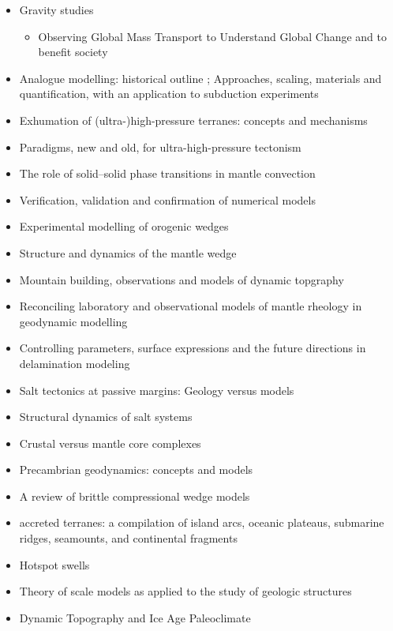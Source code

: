 \begin{itemize}
\item Gravity studies
   \begin{itemize}
   \item Observing Global Mass Transport to Understand Global Change and to benefit society \cite{pabb15}
   \end{itemize}


\item Analogue modelling: historical outline \cite{koyi97}; Approaches, scaling, materials and quantification, with an application to subduction experiments \cite{scst16}
\item Exhumation of (ultra-)high-pressure terranes: concepts and mechanisms \cite{warr13}
\item Paradigms, new and old, for ultra-high-pressure tectonism \cite{hage13}
\item The role of solid–solid phase transitions in mantle convection \cite{fada17}
\item Verification, validation and confirmation of numerical models \cite{orsb94}
\item Experimental modelling of orogenic wedges \cite{grmd12}
\item Structure and dynamics of the mantle wedge \cite{vank03}
\item Mountain building, observations and models of dynamic topgraphy \cite{flgm13,fabc13}
\item Reconciling laboratory and observational models of mantle rheology in geodynamic modelling \cite{king16}
\item Controlling parameters, surface expressions and the future directions in delamination modeling \cite{goue18}
\item Salt tectonics at passive margins: Geology versus models \cite{brfo11}
\item Structural dynamics of salt systems \cite{javs94}
\item Crustal versus mantle core complexes \cite{brst18}
\item Precambrian geodynamics: concepts and models \cite{gery14}
\item A review of brittle compressional wedge models \cite{buit12}
\item accreted terranes: a compilation of island arcs, oceanic
      plateaus, submarine ridges, seamounts, and continental fragments \cite{tebu14}
\item Hotspot swells \cite{kiad14}
\item Theory of scale models as applied to the study of geologic structures \cite{hubb37}
\item Dynamic Topography and Ice Age Paleoclimate \cite{miac20}
\end{itemize}

